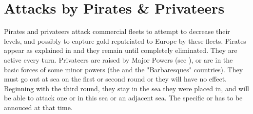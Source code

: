 

\section{Attacks by Pirates \& Privateers}\label{chRedep:CorsairAttack}

\aparag Pirates and privateers attack commercial fleets to attempt to decrease
their levels, and possibly to capture gold repatriated to Europe by these
fleets.
\bparag[Pirates] Pirates appear as explained in  and
they remain until completely eliminated. They are active every turn.
\bparag[Privateers]
\label{chRedep:CorsairAttack Privateer}
Privateers are raised by Major Powers (see ), or are in the basic forces of some minor powers (the
 and the "Barbaresques" countries). They must go out at sea
on the first or second round or they will have no effect.
\bparag Beginning with the third round, they stay in the sea they were placed
in, and will be able to attack one \STZ or \CTZ in this sea or an adjacent
sea. The specific \STZ or \CTZ has to be annouced at that time.

